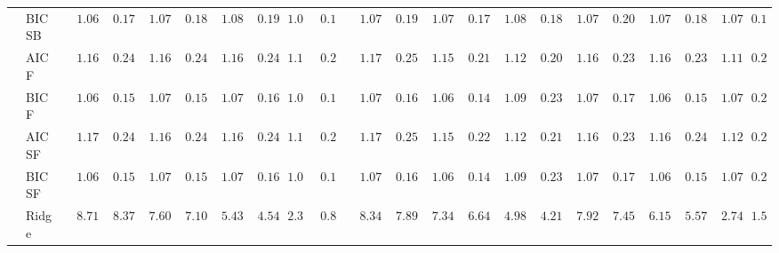 \begin{tabular}{ll|ll|llllll|llllll|llllll}
 & BIC SB  & $\phantom{00}1.06$ & $\phantom{00}0.17$ & $\phantom{00}1.07$ & $\phantom{00}0.18$ & $\phantom{00}1.08$ & $\phantom{00}0.19$ & $\phantom{0}1.07$ & $\phantom{0}0.19$ & $\phantom{00}1.07$ & $\phantom{00}0.19$ & $\phantom{00}1.07$ & $\phantom{00}0.17$ & $\phantom{00}1.08$ & $\phantom{00}0.18$ & $\phantom{00}1.07$ & $\phantom{00}0.20$ & $\phantom{00}1.07$ & $\phantom{00}0.18$ & $\phantom{00}1.07$ & $\phantom{0}0.18$ \\
 & AIC F  & $\phantom{00}1.16$ & $\phantom{00}0.24$ & $\phantom{00}1.16$ & $\phantom{00}0.24$ & $\phantom{00}1.16$ & $\phantom{00}0.24$ & $\phantom{0}1.16$ & $\phantom{0}0.24$ & $\phantom{00}1.17$ & $\phantom{00}0.25$ & $\phantom{00}1.15$ & $\phantom{00}0.21$ & $\phantom{00}1.12$ & $\phantom{00}0.20$ & $\phantom{00}1.16$ & $\phantom{00}0.23$ & $\phantom{00}1.16$ & $\phantom{00}0.23$ & $\phantom{00}1.11$ & $\phantom{0}0.20$ \\
 & BIC F  & $\phantom{00}1.06$ & $\phantom{00}0.15$ & $\phantom{00}1.07$ & $\phantom{00}0.15$ & $\phantom{00}1.07$ & $\phantom{00}0.16$ & $\phantom{0}1.07$ & $\phantom{0}0.16$ & $\phantom{00}1.07$ & $\phantom{00}0.16$ & $\phantom{00}1.06$ & $\phantom{00}0.14$ & $\phantom{00}1.09$ & $\phantom{00}0.23$ & $\phantom{00}1.07$ & $\phantom{00}0.17$ & $\phantom{00}1.06$ & $\phantom{00}0.15$ & $\phantom{00}1.07$ & $\phantom{0}0.21$ \\
 & AIC SF  & $\phantom{00}1.17$ & $\phantom{00}0.24$ & $\phantom{00}1.16$ & $\phantom{00}0.24$ & $\phantom{00}1.16$ & $\phantom{00}0.24$ & $\phantom{0}1.16$ & $\phantom{0}0.24$ & $\phantom{00}1.17$ & $\phantom{00}0.25$ & $\phantom{00}1.15$ & $\phantom{00}0.22$ & $\phantom{00}1.12$ & $\phantom{00}0.21$ & $\phantom{00}1.16$ & $\phantom{00}0.23$ & $\phantom{00}1.16$ & $\phantom{00}0.24$ & $\phantom{00}1.12$ & $\phantom{0}0.21$ \\
 & BIC SF  & $\phantom{00}1.06$ & $\phantom{00}0.15$ & $\phantom{00}1.07$ & $\phantom{00}0.15$ & $\phantom{00}1.07$ & $\phantom{00}0.16$ & $\phantom{0}1.07$ & $\phantom{0}0.16$ & $\phantom{00}1.07$ & $\phantom{00}0.16$ & $\phantom{00}1.06$ & $\phantom{00}0.14$ & $\phantom{00}1.09$ & $\phantom{00}0.23$ & $\phantom{00}1.07$ & $\phantom{00}0.17$ & $\phantom{00}1.06$ & $\phantom{00}0.15$ & $\phantom{00}1.07$ & $\phantom{0}0.21$ \\
 & Ridge  & $\phantom{00}8.71$ & $\phantom{00}8.37$ & $\phantom{00}7.60$ & $\phantom{00}7.10$ & $\phantom{00}5.43$ & $\phantom{00}4.54$ & $\phantom{0}2.31$ & $\phantom{0}0.88$ & $\phantom{00}8.34$ & $\phantom{00}7.89$ & $\phantom{00}7.34$ & $\phantom{00}6.64$ & $\phantom{00}4.98$ & $\phantom{00}4.21$ & $\phantom{00}7.92$ & $\phantom{00}7.45$ & $\phantom{00}6.15$ & $\phantom{00}5.57$ & $\phantom{00}2.74$ & $\phantom{0}1.52$ \\

\end{tabular}
